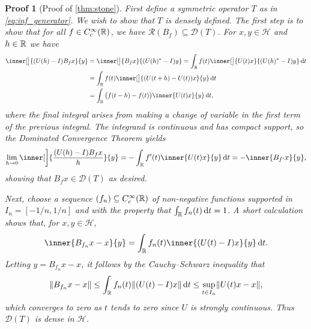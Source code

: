 \documentclass[article, a4paper, 11pt, oneside]{memoir}
\numberwithin{equation}{chapter}
\newcommand{\calH}{\mathcal{H}}
\newcommand{\dom}{\mathcal{D}}
\newcommand{\range}{\mathcal{R}}
\theoremstyle{myexample}
\theoremstyle{myexample}
\theoremstyle{myexamplebreak}
\theoremstyle{myexamplebreak}
\theoremstyle{nonumberplain}
\theoremstyle{MyNonumberplain}
\newtheorem{proofof}{Proof}
\begin{document}
\begin{proofof}[Proof of \cref{thm:stone}]
    First define a symmetric operator $T$ as in \eqref{eq:inf_generator}. We wish to show that $T$ is densely defined. The first step is to show that for all $f \in C^\infty_c(\mathbb{R})$, we have $\range(B_f) \subseteq \dom(T)$. For $x,y \in \calH$ and $h \in \mathbb{R}$ we have
    \begin{align*}
        \inner[\big]{ (U(h) - I) B_f x }{y}
            &= \inner[\big]{ B_f x }{ (U(h)^* - I) y }
             = \int_\setR f(t) \inner[\big]{U(t) x}{ (U(h)^* - I) y } \dif t \\
            &= \int_\setR f(t) \inner[\big]{(U(t+h) - U(t)) x}{ y } \dif t \\
            &= \int_\setR \big( f(t-h) - f(t) \big) \inner{U(t) x}{ y } \dif t,
    \end{align*}
    where the final integral arises from making a change of variable in the first term of the previous integral. The integrand is continuous and has compact support, so the Dominated Convergence Theorem yields
    \begin{equation*}
        \lim_{h \to 0} \inner[\bigg]{ \frac{(U(h) - I) B_f x}{h} }{y}
            = - \int_\setR f'(t) \inner{U(t)x}{y} \dif t
            = - \inner{B_{f'}x}{y},
    \end{equation*}
    showing that $B_f x \in \dom(T)$ as desired.
    
    Next, choose a sequence $(f_n) \subseteq C^\infty_c(\mathbb{R})$ of non-negative functions supported in $I_n = [-1/n, 1/n]$ and with the property that $\int_{\mathbb{R}} f_n(t) \mathop{}\!\mathrm{d} t = 1$. A short calculation shows that, for $x,y \in \calH$,
    \begin{equation*}
        \inner{B_{f_n} x - x}{y}
            = \int_\setR f_n(t) \inner{(U(t) - I)x}{y} \dif t.
    \end{equation*}
    Letting $y = B_{f_n} x - x$, it follows by the Cauchy--Schwarz inequality that
    \begin{equation*}
        \lVert B_{f_n} x - x\rVert
            \leq \int_{\mathbb{R}} f_n(t) \lVert(U(t) - I)x\rVert \mathop{}\!\mathrm{d} t
            \leq \sup_{t \in I_n} \lVert U(t)x - x\rVert,
    \end{equation*}
    which converges to zero as $t$ tends to zero since $U$ is strongly continuous. Thus $\dom(T)$ is dense in $\calH$.
    

\end{proofof}
\end{document}
